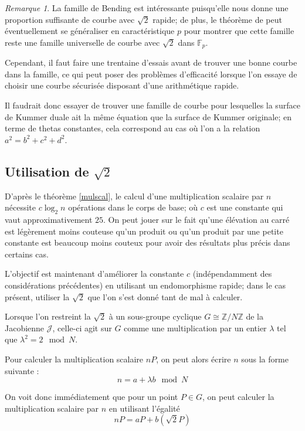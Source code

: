 \documentclass[a4paper,12pt]{article}
\theoremstyle{definition}
\theoremstyle{remark}
\newtheorem{remarque}{Remarque}
\numberwithin{equation}{section}
\begin{document}
\begin{remarque}
La famille de Bending est intéressante puisqu'elle nous donne une proportion suffisante de courbe avec $\sqrt{2}$ rapide; de plus, le théorème de \citep{bending} peut éventuellement se généraliser en caractéristique $p$ pour montrer que cette famille reste une famille universelle de courbe avec $\sqrt{2}$ dans $\mathbb{F}_p$.

Cependant, il faut faire une trentaine d'essais avant de trouver une bonne courbe dans la famille, ce qui peut poser des problèmes d'efficacité lorsque l'on essaye de choisir une courbe sécurisée disposant d'une arithmétique rapide.

Il faudrait donc essayer de trouver une famille de courbe pour lesquelles la surface de Kummer duale ait la même équation que la surface de Kummer originale; en terme de thetas constantes, cela correspond au cas où l'on a la relation $a^2 = b^2 + c^2 + d^2$.
\end{remarque}


\subsection{Utilisation de \texorpdfstring{$\sqrt{2}$}{sqrt2}}

D'après le théorème \ref{mulscal}, le calcul d'une multiplication scalaire par $n$ nécessite $c \log_2 n$ opérations dans le corps de base; où $c$ est une constante qui vaut approximativement $25$. On peut jouer sur le fait qu'une élévation au carré est légèrement moins couteuse qu'un produit ou qu'un produit par une petite constante est beaucoup moins couteux pour avoir des résultats plus précis dans certains cas.

L'objectif est maintenant d'améliorer la constante $c$ (indépendamment des considérations précédentes) en utilisant un endomorphisme rapide; dans le cas présent, utiliser la $\sqrt{2}$ que l'on s'est donné tant de mal à calculer.

Lorsque l'on restreint la $\sqrt{2}$ à un sous-groupe cyclique $G \cong \mathbb{Z}/N\mathbb{Z}$ de la Jacobienne $\mathcal{J}$, celle-ci agit sur $G$ comme une multiplication par un entier $\lambda$ tel que $\lambda^2 = 2 \mod N$.

Pour calculer la multiplication scalaire $nP$, on peut alors écrire $n$ sous la forme suivante :
$$ n = a + \lambda b \mod N$$

On voit donc immédiatement que pour un point $P \in G$, on peut calculer la multiplication scalaire par $n$ en utilisant l'égalité
$$nP = aP + b(\sqrt{2}P)$$
\end{document}
